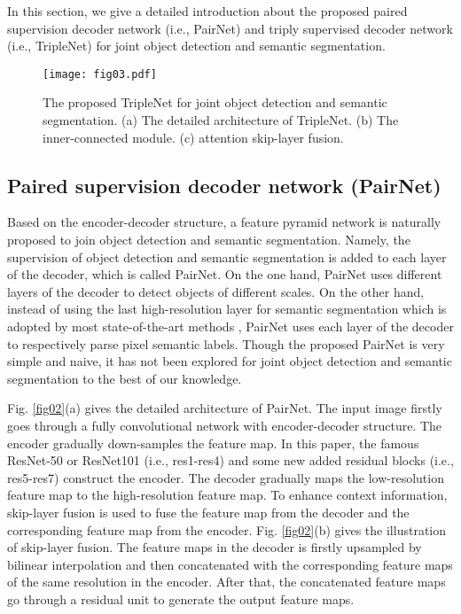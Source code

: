\documentclass[10pt,twocolumn,letterpaper]{article}
\begin{document}
In this section, we give a detailed introduction about the proposed paired supervision decoder network (i.e., PairNet) and triply supervised decoder network (i.e., TripleNet) for joint object detection and semantic segmentation.


\begin{figure*}[t]
\begin{center}
\texttt{[image: fig03.pdf]}
\end{center}
\caption{The proposed TripleNet for joint object detection and semantic segmentation. (a) The detailed architecture of TripleNet. (b) The inner-connected module. (c) attention skip-layer fusion.}
\label{fig03}
\end{figure*}

\subsection{Paired supervision decoder network (PairNet)}
\label{secPairNet}
Based on the encoder-decoder structure, a feature pyramid network is naturally proposed to join object detection and semantic segmentation. Namely, the supervision of object detection and semantic segmentation is added to each layer of the decoder, which is called PairNet. On the one hand, PairNet uses different layers of the decoder to detect objects of different scales. On the other hand, instead of using the last high-resolution layer for semantic segmentation which is adopted by most state-of-the-art methods \cite{Badrinarayanan_SegNet_PAMI_2017,Peng_Largekernl_CVPR_2017}, PairNet uses each layer of the decoder to respectively parse pixel semantic labels.  Though the proposed PairNet is very simple and naive, it has not been explored for joint object detection and semantic segmentation to the best of our knowledge.


Fig. \ref{fig02}(a) gives the detailed architecture of PairNet. The input image firstly goes through a fully convolutional network with encoder-decoder structure. The encoder gradually down-samples the feature map. In this paper, the famous ResNet-50 or ResNet101 \cite{He_ResNet_CVPR_2016} (i.e., res1-res4) and some new added residual blocks (i.e., res5-res7) construct the encoder. The decoder gradually maps the low-resolution feature map to the high-resolution feature map. To enhance context information, skip-layer fusion is used to fuse the feature map from the decoder and the corresponding feature map from the encoder. Fig. \ref{fig02}(b) gives the illustration of skip-layer fusion. The feature maps in the decoder is firstly upsampled by bilinear interpolation and then concatenated with the corresponding feature maps of the same resolution in the encoder. After that, the concatenated feature maps go through a residual unit to generate the output feature maps.
\end{document}
